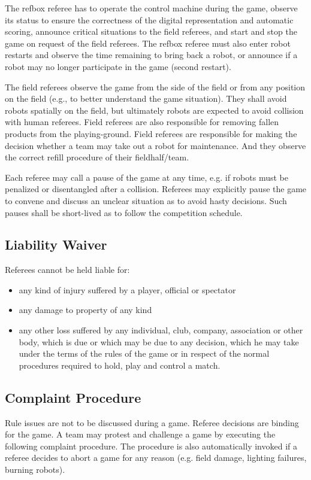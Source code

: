 \documentclass[12pt,twoside]{article}
\begin{document}
The refbox referee has to operate the control machine during the game,
observe its status to ensure the correctness of the digital
representation and automatic scoring, announce critical situations to
the field referees, and start and stop the game on request of the
field referees. The refbox referee must also enter robot restarts and
observe the time remaining to bring back a robot, or announce if a
robot may no longer participate in the game (second restart).

The field referees observe the game from the side of the field or from
any position on the field (e.g., to better understand the game
situation). They shall avoid robots spatially on the field, but
ultimately robots are expected to avoid collision with human
referees. Field referees are also responsible for removing fallen products
from the playing-ground. Field referees are responsible for making the decision
whether a team may take out a robot for maintenance. And they observe
the correct refill procedure of their fieldhalf/team.

Each referee may call a pause of the game at any time, e.g. if robots
must be penalized or disentangled after a collision. Referees may
explicitly pause the game to convene and discuss an unclear situation
as to avoid hasty decisions. Such pauses shall be short-lived as to
follow the competition schedule.

\subsection{Liability Waiver}
Referees cannot be held liable for:
\begin{itemize}
\item any kind of injury suffered by a player, official or spectator
\item any damage to property of any kind
\item any other loss suffered by any individual, club, company,
  association or other body, which is due or which may be due to any
  decision, which he may take under the terms of the rules of the game
  or in respect of the normal procedures required to hold, play and
  control a match.
\end{itemize}

\subsection{Complaint Procedure}
Rule issues are not to be discussed during a game. Referee decisions
are binding for the game. A team may protest and challenge a game by
executing the following complaint procedure. The procedure is also
automatically invoked if a referee decides to abort a game for any
reason (e.g. field damage, lighting failures, burning robots).
\end{document}
